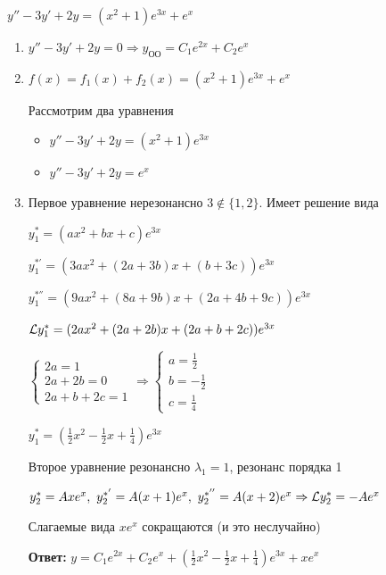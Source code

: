 \documentclass[12pt]{article}
\begin{document}
\begin{Example}{}
    $y'' - 3y' + 2y = (x^2 + 1)e^{3x} + e^x$

    \begin{enumerate}
        \item $y'' - 3y' + 2y = 0 \Rightarrow y_\text{ОО} = C_1e^{2x} + C_2e^{x}$
        
        \item $f(x) = f_1(x) + f_2(x) = (x^2 + 1)e^{3x} + e^x$

        Рассмотрим два уравнения 

        \begin{itemize}
            \item $y'' - 3y' + 2y = (x^2 + 1)e^{3x}$
            \item $y'' - 3y' + 2y = e^x$
        \end{itemize}

        \item Первое уравнение нерезонансно $3 \notin \{1, 2\}$. Имеет решение вида 
        
        $y_1^* = (ax^2 + bx + c)e^{3x}$
        
        $y_1^{*'} = (3ax^2 + (2a + 3b)x + (b + 3c))e^{3x}$

        $y_1^{*''} = (9ax^2 + (8a + 9b)x + (2a + 4b + 9c))e^{3x}$

        $\mathcal{L} y_1^* = (2ax^2 + (2a + 2b)x + (2a + b + 2c))e^{3x}$

        $\begin{cases}
            2a = 1 \\
            2a + 2b = 0 \\
            2a + b + 2c = 1
        \end{cases} \Rightarrow \begin{cases}
            a = \frac{1}{2} \\
            b = -\frac{1}{2} \\
            c = \frac{1}{4}
        \end{cases}$

        $y_1^* = \left(\frac{1}{2}x^2 - \frac{1}{2}x + \frac{1}{4}\right)e^{3x}$

        Второе уравнение резонансно $\lambda_1 = 1$, резонанс порядка 1

        $y_2^* = Axe^x,\ y_2^{*'} = A(x + 1)e^x,\ y_2^{*''} = A(x + 2)e^x \Rightarrow \L y_2^* = -Ae^x$

        Слагаемые вида $xe^x$ сокращаются (и это неслучайно)

        \textbf{Ответ:} $y = C_1e^{2x} + C_2e^x + \left( \frac{1}{2}x^2 - \frac{1}{2}x + \frac{1}{4} \right)e^{3x} + xe^x$
    \end{enumerate}
\end{Example}
\end{document}
